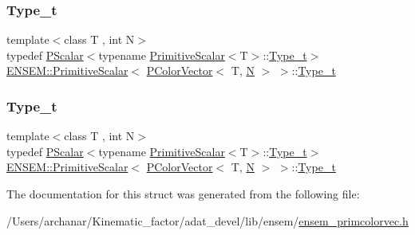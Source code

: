 \subsubsection{\texorpdfstring{Type\_t}{Type\_t}\hspace{0.1cm}{\footnotesize\ttfamily [1/2]}}
{\footnotesize\ttfamily template$<$class T , int N$>$ \\
typedef \mbox{\hyperlink{classENSEM_1_1PScalar}{P\+Scalar}}$<$typename \mbox{\hyperlink{structENSEM_1_1PrimitiveScalar}{Primitive\+Scalar}}$<$T$>$\+::\mbox{\hyperlink{structENSEM_1_1PrimitiveScalar_3_01PColorVector_3_01T_00_01N_01_4_01_4_accc4860e90963b3b1cf8d72a9a4a7163}{Type\+\_\+t}}$>$ \mbox{\hyperlink{structENSEM_1_1PrimitiveScalar}{E\+N\+S\+E\+M\+::\+Primitive\+Scalar}}$<$ \mbox{\hyperlink{classENSEM_1_1PColorVector}{P\+Color\+Vector}}$<$ T, \mbox{\hyperlink{operator__name__util_8cc_a7722c8ecbb62d99aee7ce68b1752f337}{N}} $>$ $>$\+::\mbox{\hyperlink{structENSEM_1_1PrimitiveScalar_3_01PColorVector_3_01T_00_01N_01_4_01_4_accc4860e90963b3b1cf8d72a9a4a7163}{Type\+\_\+t}}}

\mbox{\label{structENSEM_1_1PrimitiveScalar_3_01PColorVector_3_01T_00_01N_01_4_01_4_accc4860e90963b3b1cf8d72a9a4a7163}} 
\subsubsection{\texorpdfstring{Type\_t}{Type\_t}\hspace{0.1cm}{\footnotesize\ttfamily [2/2]}}
{\footnotesize\ttfamily template$<$class T , int N$>$ \\
typedef \mbox{\hyperlink{classENSEM_1_1PScalar}{P\+Scalar}}$<$typename \mbox{\hyperlink{structENSEM_1_1PrimitiveScalar}{Primitive\+Scalar}}$<$T$>$\+::\mbox{\hyperlink{structENSEM_1_1PrimitiveScalar_3_01PColorVector_3_01T_00_01N_01_4_01_4_accc4860e90963b3b1cf8d72a9a4a7163}{Type\+\_\+t}}$>$ \mbox{\hyperlink{structENSEM_1_1PrimitiveScalar}{E\+N\+S\+E\+M\+::\+Primitive\+Scalar}}$<$ \mbox{\hyperlink{classENSEM_1_1PColorVector}{P\+Color\+Vector}}$<$ T, \mbox{\hyperlink{operator__name__util_8cc_a7722c8ecbb62d99aee7ce68b1752f337}{N}} $>$ $>$\+::\mbox{\hyperlink{structENSEM_1_1PrimitiveScalar_3_01PColorVector_3_01T_00_01N_01_4_01_4_accc4860e90963b3b1cf8d72a9a4a7163}{Type\+\_\+t}}}



The documentation for this struct was generated from the following file\+:\begin{DoxyCompactItemize}
\item 
/\+Users/archanar/\+Kinematic\+\_\+factor/adat\+\_\+devel/lib/ensem/\mbox{\hyperlink{lib_2ensem_2ensem__primcolorvec_8h}{ensem\+\_\+primcolorvec.\+h}}\end{DoxyCompactItemize}
